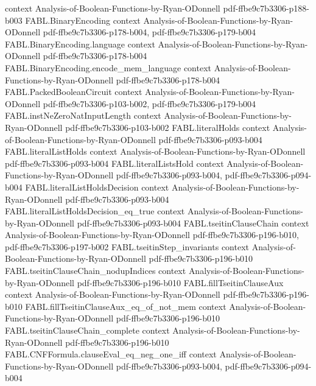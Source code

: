 \begin{theorem}
  {context}
  {Analysis-of-Boolean-Functions-by-Ryan-ODonnell}
  {pdf-ffbe9c7b3306-p188-b003}
\proofstep
  {FABL.BinaryEncoding}
  {context}
  {Analysis-of-Boolean-Functions-by-Ryan-ODonnell}
  {pdf-ffbe9c7b3306-p178-b004,
    pdf-ffbe9c7b3306-p179-b004}
\proofstep
  {FABL.BinaryEncoding.language}
  {context}
  {Analysis-of-Boolean-Functions-by-Ryan-ODonnell}
  {pdf-ffbe9c7b3306-p178-b004}
\proofstep
  {FABL.BinaryEncoding.encode_mem_language}
  {context}
  {Analysis-of-Boolean-Functions-by-Ryan-ODonnell}
  {pdf-ffbe9c7b3306-p178-b004}
\proofstep
  {FABL.PackedBooleanCircuit}
  {context}
  {Analysis-of-Boolean-Functions-by-Ryan-ODonnell}
  {pdf-ffbe9c7b3306-p103-b002,
    pdf-ffbe9c7b3306-p179-b004}
\proofstep
  {FABL.instNeZeroNatInputLength}
  {context}
  {Analysis-of-Boolean-Functions-by-Ryan-ODonnell}
  {pdf-ffbe9c7b3306-p103-b002}
\proofstep
  {FABL.literalHolds}
  {context}
  {Analysis-of-Boolean-Functions-by-Ryan-ODonnell}
  {pdf-ffbe9c7b3306-p093-b004}
\proofstep
  {FABL.literalListHolds}
  {context}
  {Analysis-of-Boolean-Functions-by-Ryan-ODonnell}
  {pdf-ffbe9c7b3306-p093-b004}
\proofstep
  {FABL.literalListsHold}
  {context}
  {Analysis-of-Boolean-Functions-by-Ryan-ODonnell}
  {pdf-ffbe9c7b3306-p093-b004,
    pdf-ffbe9c7b3306-p094-b004}
\proofstep
  {FABL.literalListHoldsDecision}
  {context}
  {Analysis-of-Boolean-Functions-by-Ryan-ODonnell}
  {pdf-ffbe9c7b3306-p093-b004}
\proofstep
  {FABL.literalListHoldsDecision_eq_true}
  {context}
  {Analysis-of-Boolean-Functions-by-Ryan-ODonnell}
  {pdf-ffbe9c7b3306-p093-b004}
\proofstep
  {FABL.tseitinClauseChain}
  {context}
  {Analysis-of-Boolean-Functions-by-Ryan-ODonnell}
  {pdf-ffbe9c7b3306-p196-b010,
    pdf-ffbe9c7b3306-p197-b002}
\proofstep
  {FABL.tseitinStep_invariants}
  {context}
  {Analysis-of-Boolean-Functions-by-Ryan-ODonnell}
  {pdf-ffbe9c7b3306-p196-b010}
\proofstep
  {FABL.tseitinClauseChain_nodupIndices}
  {context}
  {Analysis-of-Boolean-Functions-by-Ryan-ODonnell}
  {pdf-ffbe9c7b3306-p196-b010}
\proofstep
  {FABL.fillTseitinClauseAux}
  {context}
  {Analysis-of-Boolean-Functions-by-Ryan-ODonnell}
  {pdf-ffbe9c7b3306-p196-b010}
\proofstep
  {FABL.fillTseitinClauseAux_eq_of_not_mem}
  {context}
  {Analysis-of-Boolean-Functions-by-Ryan-ODonnell}
  {pdf-ffbe9c7b3306-p196-b010}
\proofstep
  {FABL.tseitinClauseChain_complete}
  {context}
  {Analysis-of-Boolean-Functions-by-Ryan-ODonnell}
  {pdf-ffbe9c7b3306-p196-b010}
\proofstep
  {FABL.CNFFormula.clauseEval_eq_neg_one_iff}
  {context}
  {Analysis-of-Boolean-Functions-by-Ryan-ODonnell}
  {pdf-ffbe9c7b3306-p093-b004,
    pdf-ffbe9c7b3306-p094-b004}

\end{theorem}
